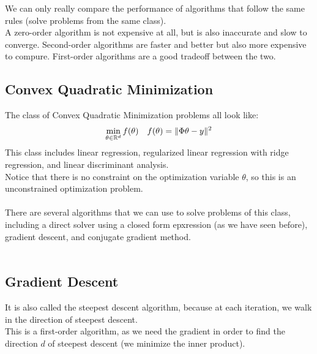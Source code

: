 \documentclass[12pt]{article}
\begin{document}
We can only really compare the performance of algorithms
that follow the same rules (solve problems from the
same class). \\

A zero-order algorithm is not expensive at all,
but is also inaccurate and slow to converge. Second-order
algorithms are faster and better but also more expensive
to compure. First-order algorithms are a good
tradeoff between the two. \\

\newpage

\subsection*{Convex Quadratic Minimization}

The class of Convex Quadratic Minimization problems
all look like:
\[ \min_{\theta \in \mathbb{R}^d} f(\theta)
\quad f(\theta) = \|\Phi \theta - y\|^2 \]
This class includes linear regression, regularized linear 
regression with ridge regression, and linear
discriminant analysis. \\

Notice that there is no constraint on the 
optimization variable $\theta$,
so this is an unconstrained optimization problem. \\

 \\

There are several algorithms that we can use to solve
problems of this class, including
a direct solver using a closed form epxression (as we
have seen before), gradient descent, and conjugate
gradient method. \\

 \\

\newpage

\subsection*{Gradient Descent}

It is also called the steepest descent algorithm,
because at each iteration, we walk in the direction
of steepest descent. \\

This is a first-order algorithm, as we need the gradient
in order to find the direction $d$ of steepest descent
(we minimize the inner product). \\
\end{document}
